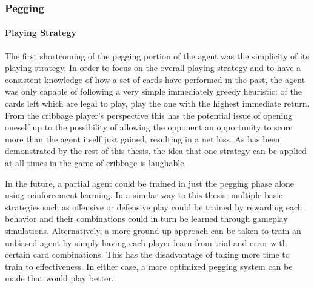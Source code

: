
\subsubsection{Pegging}



\paragraph{Playing Strategy}


The first shortcoming of the pegging portion of the agent was the simplicity
of its playing strategy.
%
In order to focus on the overall playing strategy and to have a consistent
knowledge of how a set of cards have performed in the past,
the agent was only capable of following a very simple immediately greedy 
heuristic:
of the cards left which are legal to play,
play the one with the highest immediate return.
%
From the cribbage player's perspective this has the potential issue of
opening oneself up to the possibility of allowing the opponent an opportunity
to score more than the agent itself just gained,
resulting in a net loss.
%
As has been demonstrated by the rest of this thesis,
the idea that one strategy can be applied at all times in the game of cribbage
is laughable.

In the future,
a partial agent could be trained in just the pegging phase alone
using reinforcement learning.
%
In a similar way to this thesis,
multiple basic strategies such as offensive or defensive play
could be trained by rewarding each behavior and their combinations
could in turn be learned through gameplay simulations.
%
Alternatively,
a more ground-up approach can be taken to train an unbiased agent by simply
having each player learn from trial and error with certain card combinations.
%
This has the disadvantage of taking more time to train to effectiveness.
%
In either case,
a more optimized pegging system can be made that would play better.


